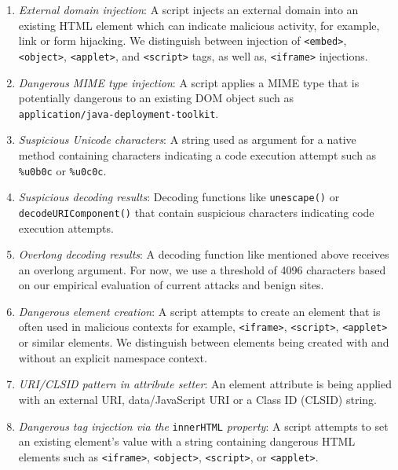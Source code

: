 \begin{enumerate}
  \item \emph{External domain injection}: A script injects an external domain into an existing HTML element which can indicate malicious activity, for example, link or form hijacking. We distinguish between injection of \verb|<embed>|, \verb|<object>|, \verb|<applet>|, and \verb|<script>| tags, as well as, \verb|<iframe>| injections.
  \item \emph{Dangerous MIME type injection}: A script applies a MIME type that is potentially dangerous to an existing DOM object such as \\ \verb|application/java-deployment-toolkit|.
  \item \emph{Suspicious Unicode characters}: A string used as argument for a native method containing characters indicating a code execution attempt such as \verb|%u0b0c| or \verb|%u0c0c|.
  \item \emph{Suspicious decoding results}: Decoding functions like \verb|unescape()| or \\ \verb|decodeURIComponent()| that contain suspicious characters indicating code execution attempts.
  \item \emph{Overlong decoding results}: A decoding function like mentioned above receives an overlong argument. For now, we use a threshold of 4096 characters based on our empirical evaluation of current attacks and benign sites.
  \item \emph{Dangerous element creation}: A script attempts to create an element that is often used in malicious contexts for example, \verb|<iframe>|, \verb|<script>|, \verb|<applet>| or similar elements. We distinguish between elements being created with and without an explicit namespace context.
  \item \emph{URI/CLSID pattern in attribute setter}: An element attribute is being applied with an external URI, data/JavaScript URI or a Class ID (CLSID) string.
  \item \emph{Dangerous tag injection via the} \verb|innerHTML| \emph{property}: A script attempts to set an existing element's value with a string containing dangerous HTML elements such as \verb|<iframe>|, \verb|<object>|, \verb|<script>|, or \verb|<applet>|.
\end{enumerate}


